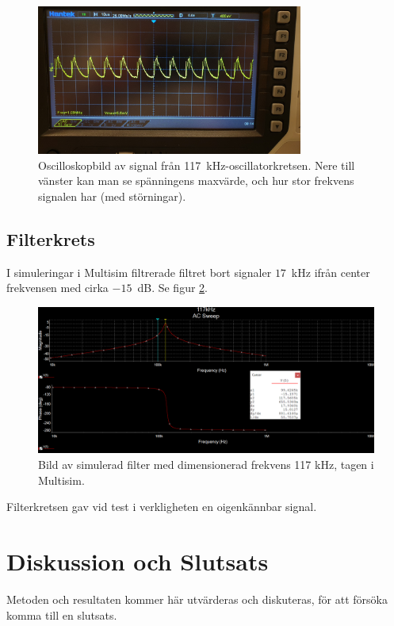 \documentclass[a4paper]{article}
\begin{document}
\begin{sloppypar}
    \begin{figure}[H]
        \centering
        \includegraphics[width = 0.78\textwidth]{signal-555-117kHz.jpg}
        \caption{Oscilloskopbild av signal från 117~kHz-oscillatorkretsen. Nere till vänster kan man se spänningens maxvärde, och hur stor frekvens signalen har (med störningar).}
        \label{fig:signal-117kHz}
    \end{figure}


    \subsection{Filterkrets}
    I simuleringar i Multisim filtrerade filtret bort signaler $17$~kHz ifrån center frekvensen med cirka $-15$~dB. Se figur \ref{fig:sim-117kHz-filter}.
    \begin{figure}[H]
        \centering
        \includegraphics[width=\textwidth]{filter117kHz.png}
        \caption{Bild av simulerad filter med dimensionerad frekvens 117 kHz, tagen i Multisim.}
        \label{fig:sim-117kHz-filter}
    \end{figure}
    \noindent
    Filterkretsen gav vid test i verkligheten en oigenkännbar signal.

    \newpage
    \section{Diskussion och Slutsats}
    Metoden och resultaten kommer här utvärderas och diskuteras, för att försöka komma till en slutsats.


\end{sloppypar}
\end{document}
